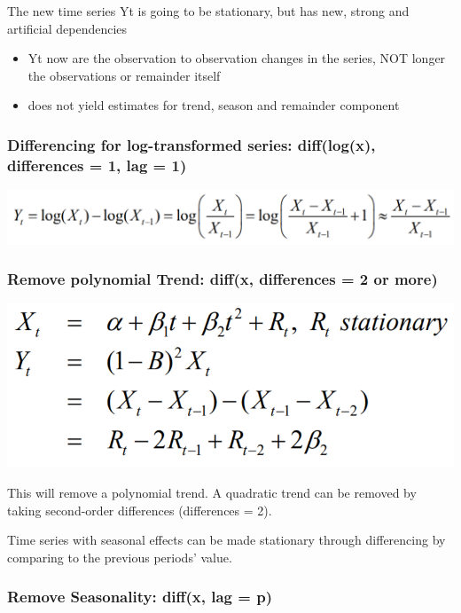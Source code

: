 \documentclass[
]{article}
\providecommand{\tightlist}{%
  \setlength{\itemsep}{0pt}\setlength{\parskip}{0pt}}
\begin{document}
The new time series Yt is going to be stationary, but has new, strong
and artificial dependencies

\begin{itemize}
\tightlist
\item
  Yt now are the observation to observation changes in the series, NOT
  longer the observations or remainder itself
\item
  does not yield estimates for trend, season and remainder component
\end{itemize}

\hypertarget{differencing-for-log-transformed-series-difflogx-differences-1-lag-1}{%
\subsubsection{Differencing for log-transformed series: diff(log(x),
differences = 1, lag =
1)}\label{differencing-for-log-transformed-series-difflogx-differences-1-lag-1}}

\includegraphics[width=0.5\linewidth]{diff_log}

\hypertarget{remove-polynomial-trend-diffx-differences-2-or-more}{%
\subsubsection{Remove polynomial Trend: diff(x, differences = 2 or
more)}\label{remove-polynomial-trend-diffx-differences-2-or-more}}

\includegraphics[width=0.5\linewidth]{diff_higher}

This will remove a polynomial trend. A quadratic trend can be removed by
taking second-order differences (differences = 2).

Time series with seasonal effects can be made stationary through
differencing by comparing to the previous periods' value.

\hypertarget{remove-seasonality-diffx-lag-p}{%
\subsubsection{Remove Seasonality: diff(x, lag =
p)}\label{remove-seasonality-diffx-lag-p}}
\end{document}
